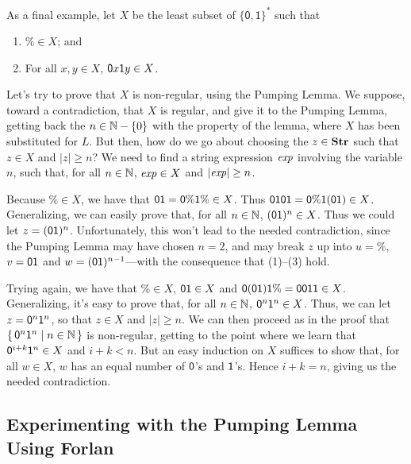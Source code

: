As a final example, let $X$ be the least subset of
$\{\mathsf{0,1}\}^*$ such that
\begin{enumerate}[\quad(1)]
\item $\%\in X$; and

\item For all $x,y\in X$, $\mathsf{0} x\mathsf{1} y\in X$.
\end{enumerate}
Let's try to prove that $X$ is non-regular, using the Pumping Lemma.
We suppose, toward a contradiction, that $X$ is regular, and give it
to the Pumping Lemma, getting back the $n\in\mathbb{N}-\{0\}$ with the property
of the lemma, where $X$ has been substituted for $L$.  But then, how
do we go about choosing the $z\in\mathbf{Str}$ such that $z\in X$ and $|z|\geq
n$?  We need to find a string expression ${\it exp}$ involving the
variable $n$, such that, for all $n\in\mathbb{N}$, ${\it exp}\in X$
and $|{\it exp}|\geq n$.

Because $\%\in X$, we have that
$\mathsf{0}\mathsf{1}=\mathsf{0}\%\mathsf{1}\%\in X$.  Thus
$\mathsf{0}\mathsf{1}\mathsf{0}\mathsf{1}=\mathsf{0}\%\mathsf{1}(\mathsf{0}\mathsf{1})\in X$.
Generalizing, we can easily prove that, for all $n\in\mathbb{N}$,
$(\mathsf{0}\mathsf{1})^n\in X$.  Thus we could let $z=(\mathsf{0}\mathsf{1})^n$.
Unfortunately, this won't lead to the needed contradiction, since the
Pumping Lemma may have chosen $n=2$, and may break $z$
up into $u=\%$, $v=\mathsf{0}\mathsf{1}$ and $w=(\mathsf{0}\mathsf{1})^{n-1}$---with
the consequence that (1)--(3) hold.

Trying again, we have that $\%\in X$, $\mathsf{0}\mathsf{1}\in X$ and
$\mathsf{0}(\mathsf{0}\mathsf{1})\mathsf{1}\%=\mathsf{0}\mathsf{0}\mathsf{1}\mathsf{1}\in X$.
Generalizing, it's easy to prove that, for all $n\in\mathbb{N}$,
$\mathsf{0}^n\mathsf{1}^n\in X$.  Thus, we can let $z=\mathsf{0}^n\mathsf{1}^n$, so
that $z\in X$ and $|z|\geq n$.  We can then proceed as in the proof
that $\{ \, \mathsf{0}^n\mathsf{1}^n \mid n\in\mathbb{N} \, \}$ is non-regular, getting to
the point where we learn that $\mathsf{0}^{i+k}\mathsf{1}^n\in X$ and
$i+k<n$.  But an easy induction on $X$ suffices to show that, for all
$w\in X$, $w$ has an equal number of $\mathsf{0}$'s and $\mathsf{1}$'s.
Hence $i+k=n$, giving us the needed contradiction.
%
%

\subsection{Experimenting with the Pumping Lemma Using Forlan}

